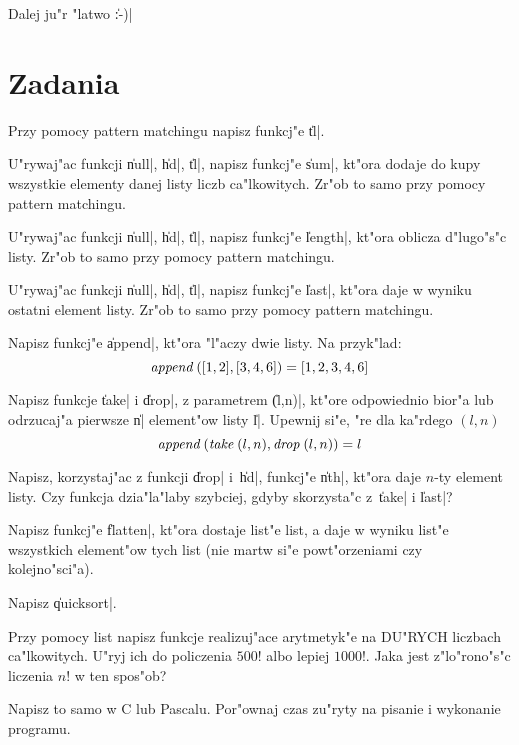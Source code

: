 Dalej ju"r "latwo \|:-)|


\section*{Zadania}
\begin{exercises}

\item%
Przy pomocy pattern matchingu napisz funkcj"e \|tl|.

\item%
U"rywaj"ac funkcji \|null|, \|hd|, \|tl|,
napisz funkcj"e \|sum|, kt"ora dodaje do kupy
wszystkie elementy danej listy liczb ca"lkowitych.
Zr"ob to samo przy pomocy pattern matchingu.

\item%
U"rywaj"ac funkcji \|null|, \|hd|, \|tl|,
napisz funkcj"e \|length|, kt"ora oblicza d"lugo"s"c listy.
Zr"ob to samo przy pomocy pattern matchingu.

\item%
U"rywaj"ac funkcji \|null|, \|hd|, \|tl|,
napisz funkcj"e \|last|, kt"ora daje w wyniku ostatni element listy.
Zr"ob to samo przy pomocy pattern matchingu.

\item%
Napisz funkcj"e \|append|, kt"ora "l"aczy dwie listy.
Na przyk"lad:
 $$\f{append} ([1, 2], [3, 4, 6]) = [1, 2, 3, 4, 6]$$

\item%
Napisz funkcje \|take| i \|drop|, z parametrem \|(l,n)|,
kt"ore odpowiednio bior"a lub odrzucaj"a 
pierwsze \|n| element"ow listy \|l|.
Upewnij si"e, "re dla ka"rdego $(l, n)$ 
$$
\f{append} (\f{take} (l, n), \f{drop} (l, n)) = l
$$


\item%
Napisz, korzystaj"ac z funkcji \|drop| i~\|hd|,
funkcj"e \|nth|, kt"ora daje $n$-ty element listy.
Czy funkcja dzia"la"laby szybciej, gdyby skorzysta"c z~\|take| i \|last|? 

\item%
Napisz funkcj"e \|flatten|, kt"ora dostaje list"e list, 
a daje w wyniku list"e wszystkich element"ow tych list
(nie martw si"e powt"orzeniami czy kolejno"sci"a).

\item%
Napisz \|quicksort|.

\item%
Przy pomocy list napisz funkcje realizuj"ace arytmetyk"e na DU\-"RYCH
liczbach ca"lkowitych. U"ryj ich do policzenia $500!$ albo lepiej
$1000!$. Jaka jest z"lo"rono"s"c liczenia $n!$ w ten spos"ob?

\item%
Napisz to samo w C lub Pascalu. Por"ownaj czas zu"ryty na pisanie i
wykonanie programu.

\end{exercises}

